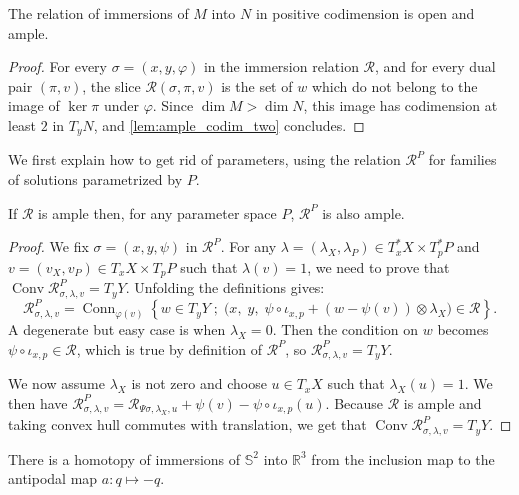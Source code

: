 \documentclass[10pt,a4paper]{article}
\newcommand{\Rel}{\mathcal{R}} %
\DeclareMathOperator{\Conv}{Conv} %
\DeclareMathOperator{\Conn}{Conn} %
\newcommand{\uses}[1]{}
\newcommand{\proves}[1]{}
\newcommand{\lean}[1]{}
\newcommand{\leanok}{}
\begin{document}
\begin{lemma}
  \label{lem:open_ample_immersion}
  \uses{def:ample_relation}
  \leanok
  \lean{immersionRel_open_ample}
  The relation of immersions of $M$ into $N$ in positive codimension is open
  and ample.
\end{lemma}

\begin{proof}
  \proves{lem:open_ample_immersion}
  \uses{lem:ample_codim_two}
  \lean{immersionRel_open_ample}
  \leanok
  For every $σ = (x, y, φ)$ in the immersion relation $\Rel$,
  and for every dual pair $(π, v)$, the slice
  $\Rel(σ, π, v)$ is the set of $w$ which do not belong to
  the image of $\ker π$ under $φ$.
  Since $\dim M > \dim N$, this image has codimension at least $2$ in
  $T_yN$, and \cref{lem:ample_codim_two} concludes.
\end{proof}



We first explain how to get rid of parameters, using the
relation $\Rel^P$ for families of solutions parametrized by $P$.

\begin{lemma}
    \label{lem:ample_parameter}
    \uses{def:ample_relation}
    \lean{RelMfld.Ample.relativize}
    \leanok
    If $\Rel$ is ample then, for any parameter space $P$, $\Rel^P$ is also ample.
\end{lemma}

\begin{proof}
  \leanok
  We fix $σ = (x, y, ψ)$ in $\Rel^P$.
  For any $λ = (λ_X, λ_P) ∈ T^*_xX × T^*_pP$ and $v = (v_X, v_P) ∈ T_xX × T_pP$
  such that $λ(v) = 1$, we need to prove that $\Conv\Rel^P_{σ, λ, v} = T_yY$.
  Unfolding the definitions gives:
  \[
  \Rel^P_{σ, λ, v} = \Conn_{φ(v)}\left\{w ∈ T_yY \;;\;
      \big(x,\; y,\; ψ ∘ ι_{x, p} + (w - ψ(v))⊗λ_X\big) ∈ \Rel\right\}.
  \]
  A degenerate but easy case is when $λ_X = 0$. Then the condition on $w$
  becomes $ψ ∘ ι_{x, p} ∈ \Rel$, which is true by definition of $\Rel^P$, so
  $\Rel^P_{σ, λ, v} = T_yY$.

  We now assume $λ_X$ is not zero and choose $u ∈ T_xX$ such that $λ_X(u) = 1$.
  We then have $\Rel^P_{σ, λ, v} = \Rel_{Ψσ, λ_X, u} + ψ(v) - ψ∘ι_{x, p}(u)$.
  Because $\Rel$ is ample and taking convex hull commutes with translation, we
  get that $\Conv\Rel^P_{σ, λ, v} = T_yY$.
\end{proof}



\begin{theorem}[Smale 1958]
  \label{thm:sphere_eversion}
  \lean{sphere_eversion}\leanok
	There is a homotopy of immersions of $𝕊^2$ into $ℝ^3$ from the inclusion map to
	the antipodal map $a : q ↦ -q$.
\end{theorem}
\end{document}
